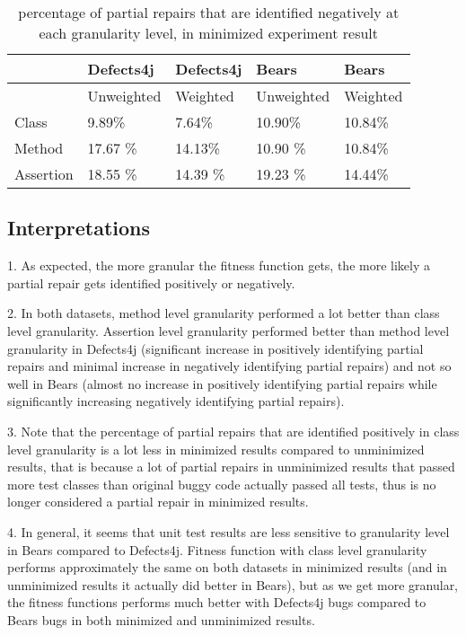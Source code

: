 \documentclass[sigconf, timestamp-false, anonymous=true]{acmart}
\begin{document}
    
\begin{table}
{\begin{center}
    \begin{tabular}{| l | l | l | l | l |} \hline
     & Defects4j & Defects4j & Bears & Bears  \\ \hline
     & Unweighted & Weighted & Unweighted & Weighted \\ \hline
    Class & 9.89\% & 7.64\% & 10.90\% & 10.84\%\\
    Method & 17.67 \% & 14.13\% & 10.90 \% & 10.84\% \\
    Assertion & 18.55 \% & 14.39 \% & 19.23 \% & 14.44\% \\
    \hline
    
    \end{tabular}
    
\end{center}}
\caption{percentage of partial repairs that are identified negatively at each granularity level, in minimized experiment result}
\end{table}
\subsection{Interpretations}

1. As expected, the more granular the fitness function gets, the more 
likely a partial repair gets identified positively or negatively.

2. In both datasets, method level granularity performed a lot better 
than class level granularity. Assertion level granularity performed 
better than method level granularity in Defects4j (significant increase 
in positively identifying partial repairs and minimal increase in negatively 
identifying partial repairs) and not so well in Bears (almost no increase in 
positively identifying partial repairs while significantly 
increasing negatively identifying partial repairs). 

3. Note that the percentage of
partial repairs that are identified positively in class level granularity is a lot
less in minimized results compared to unminimized results, that is because 
a lot of partial repairs in unminimized results that passed more test classes than
original buggy code actually passed all tests, thus is no longer considered 
a partial repair in minimized results.

4. In general, it seems that unit test results are less sensitive to granularity 
level in Bears compared to Defects4j. Fitness function with class level 
granularity performs approximately the same on both datasets in minimized results 
(and in unminimized results it actually did better in Bears), but as we get more 
granular, the fitness functions performs much better with Defects4j bugs compared 
to Bears bugs in both minimized and unminimized results.
\end{document}
